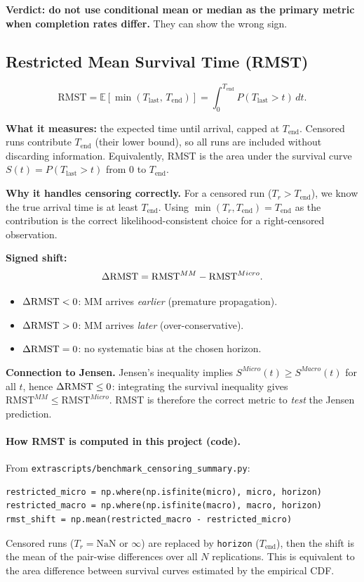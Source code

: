 \documentclass[11pt,a4paper]{article}
\begin{document}
\textbf{Verdict: do not use conditional mean or median as the primary metric
when completion rates differ.}  They can show the wrong sign.

\subsection{Restricted Mean Survival Time (RMST)}
\label{sec:rmst}

\[
  \mathrm{RMST}
  = \mathbb{E}\!\left[\min(T_{\mathrm{last}},\, T_{\mathrm{end}})\right]
  = \int_0^{T_{\mathrm{end}}} P(T_{\mathrm{last}} > t)\, dt.
\]

\textbf{What it measures:} the expected time until arrival, capped at
$T_{\mathrm{end}}$.  Censored runs contribute $T_{\mathrm{end}}$ (their lower
bound), so all runs are included without discarding information.
Equivalently, RMST is the area under the survival curve $S(t) =
P(T_{\mathrm{last}} > t)$ from $0$ to $T_{\mathrm{end}}$.

\textbf{Why it handles censoring correctly.}
For a censored run ($T_r > T_{\mathrm{end}}$), we know the true arrival
time is at least $T_{\mathrm{end}}$.  Using $\min(T_r, T_{\mathrm{end}}) =
T_{\mathrm{end}}$ as the contribution is the correct likelihood-consistent
choice for a right-censored observation.

\textbf{Signed shift:}
\[
  \Delta\mathrm{RMST} = \mathrm{RMST}^{MM} - \mathrm{RMST}^{Micro}.
\]
\begin{itemize}
  \item $\Delta\mathrm{RMST} < 0$: MM arrives \emph{earlier} (premature propagation).
  \item $\Delta\mathrm{RMST} > 0$: MM arrives \emph{later} (over-conservative).
  \item $\Delta\mathrm{RMST} = 0$: no systematic bias at the chosen horizon.
\end{itemize}

\textbf{Connection to Jensen.}
Jensen's inequality implies $S^{Micro}(t) \geq S^{Macro}(t)$ for all $t$,
hence $\Delta\mathrm{RMST} \leq 0$: integrating the survival inequality gives
$\mathrm{RMST}^{MM} \leq \mathrm{RMST}^{Micro}$.  RMST is therefore
the correct metric to \emph{test} the Jensen prediction.

\paragraph{How RMST is computed in this project (code).}
From \texttt{extrascripts/benchmark\_censoring\_summary.py}:
\begin{verbatim}
restricted_micro = np.where(np.isfinite(micro), micro, horizon)
restricted_macro = np.where(np.isfinite(macro), macro, horizon)
rmst_shift = np.mean(restricted_macro - restricted_micro)
\end{verbatim}
Censored runs ($T_r = \mathrm{NaN}$ or $\infty$) are replaced by \texttt{horizon}
($T_{\mathrm{end}}$), then the shift is the mean of the pair-wise differences
over all $N$ replications.  This is equivalent to the area difference between
survival curves estimated by the empirical CDF.
\end{document}
